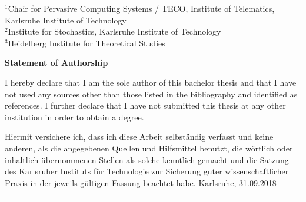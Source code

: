 \documentclass[12pt,a4paper,twoside]{scrartcl}
\numberwithin{equation}{section}
\begin{document}
\begin{titlepage}
\begin{center}
    \vspace*{10mm}


    \(^1\)Chair for Pervasive Computing Systems / TECO, Institute of Telematics, Karlsruhe Institute of Technology\\
    \(^2\)Institute for Stochastics, Karlsruhe Institute of Technology\\
    \(^3\)Heidelberg Institute for Theoretical Studies

    \vspace*{12mm}
  \end{center}

\end{titlepage}



\centerline{\bf Statement of Authorship}
\vfill

I hereby declare that I am the sole author of this bachelor thesis  and that I have not used any sources other than those listed in the bibliography and identified as references. I further declare that I have not submitted this thesis at any other institution in order to obtain a degree.

\vfill
\noindent

\vfill
Hiermit versichere ich, dass ich diese Arbeit selbständig verfasst und keine anderen, als die angegebenen Quellen und Hilfsmittel benutzt, die wörtlich oder inhaltlich übernommenen Stellen als solche kenntlich gemacht und die Satzung des Karlsruher Instituts für Technologie zur Sicherung guter wissenschaftlicher Praxis in der jeweils gültigen Fassung beachtet habe.
\vfill
\noindent
Karlsruhe, 31.09.2018
\hrule


\vspace*{5cm}

\clearpage


\vspace*{0pt}\vfill

\end{document}
